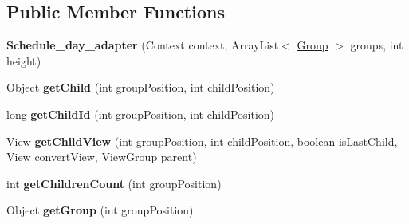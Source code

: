 \subsection*{Public Member Functions}
\begin{DoxyCompactItemize}
\item 
\hypertarget{classantardhvani_1_1du_1_1ac_1_1in_1_1_adapter_1_1_schedule__day__adapter_aab261a3878178fb423195cfbf018b601}{}{\bfseries Schedule\+\_\+day\+\_\+adapter} (Context context, Array\+List$<$ \hyperlink{classantardhvani_1_1du_1_1ac_1_1in_1_1_adapter_1_1_group}{Group} $>$ groups, int height)\label{classantardhvani_1_1du_1_1ac_1_1in_1_1_adapter_1_1_schedule__day__adapter_aab261a3878178fb423195cfbf018b601}

\item 
\hypertarget{classantardhvani_1_1du_1_1ac_1_1in_1_1_adapter_1_1_schedule__day__adapter_a7b24475bde9941d86127a9835732e65a}{}Object {\bfseries get\+Child} (int group\+Position, int child\+Position)\label{classantardhvani_1_1du_1_1ac_1_1in_1_1_adapter_1_1_schedule__day__adapter_a7b24475bde9941d86127a9835732e65a}

\item 
\hypertarget{classantardhvani_1_1du_1_1ac_1_1in_1_1_adapter_1_1_schedule__day__adapter_a2a9078f0c54d8d142bf3a9a62ac006ad}{}long {\bfseries get\+Child\+Id} (int group\+Position, int child\+Position)\label{classantardhvani_1_1du_1_1ac_1_1in_1_1_adapter_1_1_schedule__day__adapter_a2a9078f0c54d8d142bf3a9a62ac006ad}

\item 
\hypertarget{classantardhvani_1_1du_1_1ac_1_1in_1_1_adapter_1_1_schedule__day__adapter_a5672bfb65b0219d3826e949c39d45d39}{}View {\bfseries get\+Child\+View} (int group\+Position, int child\+Position, boolean is\+Last\+Child, View convert\+View, View\+Group parent)\label{classantardhvani_1_1du_1_1ac_1_1in_1_1_adapter_1_1_schedule__day__adapter_a5672bfb65b0219d3826e949c39d45d39}

\item 
\hypertarget{classantardhvani_1_1du_1_1ac_1_1in_1_1_adapter_1_1_schedule__day__adapter_a640ecd3ed412ce089be11107e7f2f1d0}{}int {\bfseries get\+Children\+Count} (int group\+Position)\label{classantardhvani_1_1du_1_1ac_1_1in_1_1_adapter_1_1_schedule__day__adapter_a640ecd3ed412ce089be11107e7f2f1d0}

\item 
\hypertarget{classantardhvani_1_1du_1_1ac_1_1in_1_1_adapter_1_1_schedule__day__adapter_a390dbc3dce7dc639b853f96884a82706}{}Object {\bfseries get\+Group} (int group\+Position)\label{classantardhvani_1_1du_1_1ac_1_1in_1_1_adapter_1_1_schedule__day__adapter_a390dbc3dce7dc639b853f96884a82706}


\end{DoxyCompactItemize}
